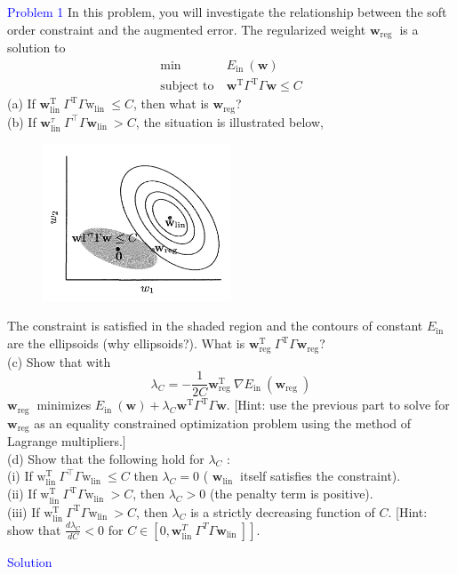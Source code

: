 \textcolor{blue}{Problem 1}
In this problem, you will investigate the relationship between the soft order constraint and the augmented error. The regularized weight $\mathbf{w}_{\text {reg }}$ is a solution to
\begin{align*}
\min &\ E_{\text {in }}(\mathbf{w}) \\
\text {subject to} &\ \mathbf{w}^{\mathrm{T}} \Gamma^{\mathrm{T}} \Gamma \mathbf{w} \leq C
\end{align*}
(a) If $\mathbf{w}_{\text {lin }}^{\mathrm{T}} \Gamma^{\mathrm{T}} \Gamma \mathrm{w}_{\text {lin }} \leq C$, then what is $\mathbf{w}_{\text{reg}}$?\\
(b) If $\mathbf{w}_{\text {lin }}^\tau \Gamma^{\top} \Gamma \mathbf{w}_{\text {lin }}>C$, the situation is illustrated below,
\begin{figure}[htbp]
    \center
    \includegraphics[width=0.5\textwidth]{../fig/p1.png}
\end{figure}

The constraint is satisfied in the shaded region and the contours of constant $E_{\text {in }}$ are the ellipsoids (why ellipsoids?). What is $\mathbf{w}_{\text {reg }}^{\mathrm{T}} \Gamma^{\mathrm{T}} \Gamma \mathbf{w}_{\mathrm{reg}}$?\\
(c) Show that with
$$
\lambda_C=-\frac{1}{2 C} \mathbf{w}_{\text {reg }}^{\mathrm{T}} \nabla E_{\text {in }}\left(\mathbf{w}_{\text {reg }}\right)
$$
$\mathbf{w}_{\text {reg }}$ minimizes $E_{\text {in }}(\mathbf{w})+\lambda_C \mathbf{w}^{\mathrm{T}} \Gamma^{\mathrm{T}} \Gamma \mathbf{w}$. [Hint: use the previous part to solve for $\mathbf{w}_{\text{reg}}$ as an equality constrained optimization problem using the method of Lagrange multipliers.]\\
(d) Show that the following hold for $\lambda_C$ :\\
(i) If $\mathrm{w}_{\text {lin }}^{\mathrm{T}} \Gamma^{\top} \Gamma \mathrm{w}_{\text {lin }} \leq C$ then $\lambda_C=0$ ( $\mathbf{w}_{\text {lin }}$ itself satisfies the constraint).\\
(ii) If $\mathrm{w}_{\text {lin }}^{\mathrm{T}} \Gamma^{\mathrm{T}} \Gamma \mathrm{w}_{\text {lin }}>C$, then $\lambda_C>0$ (the penalty term is positive).\\
(iii) If $\mathrm{w}_{\text {lin }}^{\mathrm{T}} \Gamma^{\mathrm{T}} \Gamma \mathrm{w}_{\text {lin }}>C$, then $\lambda_C$ is a strictly decreasing function of $C$. [Hint: show that $\frac{d \lambda_C}{d C}<0$ for $\left.C \in\left[0, \mathbf{w}_{\text {lin }}^T \Gamma^T \Gamma \mathbf{w}_{\text {lin }}\right]\right]$.

\textcolor{blue}{Solution}\\















\newpage